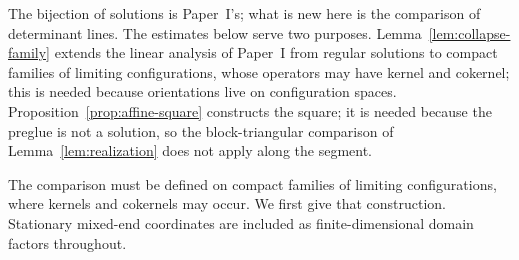 \documentclass[11pt]{amsart}
\theoremstyle{definition}
\theoremstyle{remark}
\theoremstyle{plain}
\numberwithin{equation}{section}
\begin{document}
The bijection of solutions is Paper~I's; what is new here is the
comparison of determinant lines. The estimates below serve two purposes.
Lemma~\ref{lem:collapse-family} extends the linear analysis of Paper~I
from regular solutions to compact families of limiting configurations,
whose operators may have kernel and cokernel; this is needed because
orientations live on configuration spaces.
Proposition~\ref{prop:affine-square} constructs the square; it is needed
because the preglue is not a solution, so the block-triangular comparison
of Lemma~\ref{lem:realization} does not apply along the segment.

The comparison must be defined on compact families of limiting
configurations, where kernels and cokernels may occur. We first give
that construction. Stationary mixed-end coordinates are included
as finite-dimensional domain factors throughout.
\end{document}
